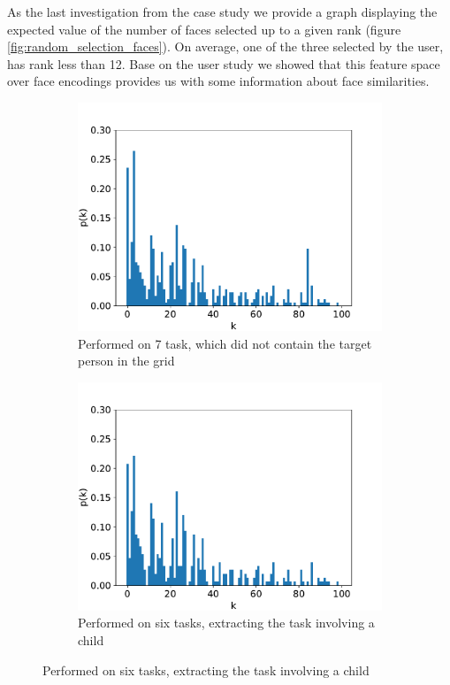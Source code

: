 As the last investigation from the case study we provide a graph displaying the expected value of the number of faces selected up to a given rank (figure \ref{fig:random_selection_faces}). On average, one of the three selected by the user, has rank less than 12. Base on the user study we showed that this feature space over face encodings provides us with some information about face similarities.

\begin{figure}
    \centering
    \begin{subfigure}[b]{0.48\textwidth}
     \centering
     \includegraphics[width=\textwidth]{graphs/survey_distribution_without_the_easy.pdf}
     \caption{Performed on 7 task, which did not contain the target person in the grid}
     \label{fig:survey_all}
    \end{subfigure}
    \begin{subfigure}[b]{0.48\textwidth}
     \centering
     \includegraphics[width=\textwidth]{graphs/survey_distribution_childless.pdf}
     \caption{Performed on six tasks, extracting the task involving a child}
     \label{fig:suvery_childless}
    \end{subfigure}
    

\end{figure}
